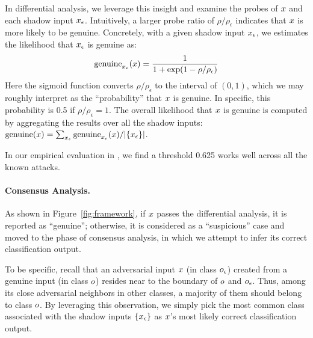 In differential analysis, we leverage this insight and examine the probes of $x$ and each shadow input $x_{\epsilon}$. Intuitively, a larger probe ratio of $\rho/\rho_\epsilon$ indicates that $x$ is more likely to be genuine. Concretely, with a given shadow input $x_{\epsilon}$, we estimates the likelihood that $x_{\epsilon}$ is genuine as:
\begin{equation*}
{\rm genuine}_{x_{\epsilon}}(x) = \frac{1}{1 + \exp(1-\rho/\rho_\epsilon)}
\end{equation*}
Here the sigmoid function converts $\rho/\rho_\epsilon$ to the interval of $(0, 1)$, which we may roughly interpret as the ``probability'' that $x$ is genuine. In specific, this probability is 0.5 if $\rho/\rho_\epsilon = 1$. The overall likelihood that $x$ is genuine is computed by aggregating the results over all the shadow inputs:
${\rm genuine}(x) = \sum_{x_{\epsilon}}{\rm genuine}_{x_{\epsilon}}(x)/|\{x_{\epsilon}\}|$.

In our empirical evaluation in , we find a threshold 0.625 works well across all the known attacks.



\paragraph*{Consensus Analysis.\;}
As shown in Figure~\ref{fig:framework}, if $x$ passes the differential analysis, it is reported as ``genuine''; otherwise, it is considered as a ``suspicious'' case and moved to the phase of consensus analysis, in which we attempt to infer its correct classification output.

To be specific, recall that an adversarial input $x$ (in class $o_\epsilon$) created from a genuine input (in class $o$) resides near to the boundary of $o$ and $o_\epsilon$. Thus, among its close adversarial neighbors in other classes, a majority of them should belong to class $o$. By leveraging this observation, we simply pick the most common class associated with the shadow inputs $\{x_{\epsilon}\}$ as $x$'s most likely correct classification output.







